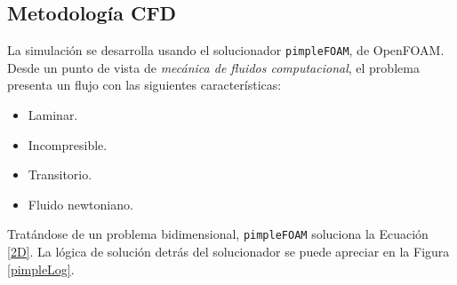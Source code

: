 \subsection{Metodolog\'ia CFD} \label{MetCFD}

\noindent
\justify

La simulaci\'on se desarrolla usando el solucionador \texttt{pimpleFOAM}, de OpenFOAM. Desde un punto de vista de \textit{mec\'anica de fluidos computacional}, el problema presenta un flujo con las siguientes caracter\'isticas:

\begin{itemize}
	\item Laminar.
	\item Incompresible.
	\item Transitorio.
	\item Fluido newtoniano.
\end{itemize}

\noindent
\justify

Trat\'andose de un problema bidimensional, \texttt{pimpleFOAM} soluciona la Ecuaci\'on \ref{2D}. La l\'ogica de soluci\'on detr\'as del solucionador se puede apreciar en la Figura \ref{pimpleLog}.


